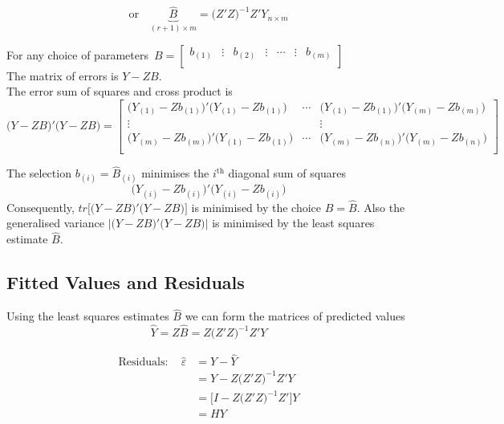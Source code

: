 \documentclass[11pt,a4paper]{article}
\theoremstyle{definition}
\begin{document}
\begin{equation}\tag{5}
\text{or}\quad  \underbrace{\widehat{B}}_{(r+1)\times m} = \big(Z'Z\big)^{-1}Z'Y_{n\times m}
\end{equation}

For any choice of parameters \,$ B = \begin{bmatrix}
b_{(1)} & \vdots & b_{(2)} & \vdots & \cdots& \vdots & b_{(m)}\\
\end{bmatrix}
$\\

The matrix of errors is $Y-ZB.$\\
The error sum of squares and cross product is
$$\big(Y-ZB\big)'\big(Y-ZB\big)=
\begin{bmatrix}
\big(Y_{(1)}-Zb_{(1)}\big)'\big(Y_{(1)}-Zb_{(1)}\big) & \cdots& \big(Y_{(1)}-Zb_{(1)}\big)'\big(Y_{(m)}-Zb_{(m)}\big)\\
\vdots   &  & \vdots\\
\big(Y_{(m)}-Zb_{(m)}\big)'\big(Y_{(1)}-Zb_{(1)}\big) & \cdots& \big(Y_{(m)}-Zb_{(n)}\big)'\big(Y_{(m)}-Zb_{(n)}\big)\\
\end{bmatrix}
$$



The selection $b_{(i)}=\widehat{B}_{(i)}$ minimises the $i^{\text{th}}$ diagonal sum of squares  $$\big(Y_{(i)} - Zb_{(i)}\big)'\big(Y_{(i)}-Zb_{(i)}\big)$$
Consequently, $tr\big[\big(Y-ZB\big)'\big(Y-ZB\big)\big]$ is minimised by the choice $B=\widehat{B}$. Also the generalised variance $\big|\big(Y-ZB\big)'\big(Y-ZB\big)|$ is minimised by the least squares estimate $\widehat{B}$.\\
\subsection{Fitted Values and Residuals}
Using the least squares estimates $\widehat{B}$ we can form the matrices of predicted values 
\begin{equation}\tag{7}
\widehat{Y} = Z\widehat{B} = Z\big(Z'Z\big)^{-1}Z'Y
\end{equation}

\begin{align*}
\text{Residuals}:\quad  \widehat{\varepsilon} & = Y - \widehat{Y}\\
                                                  & = Y - Z\big(Z'Z\big)^{-1}Z'Y\\
                                                  & = \big[I- Z\big(Z'Z\big)^{-1}Z'\big]Y\\
                                                  & = HY\tag{8}
\end{align*}
\end{document}
